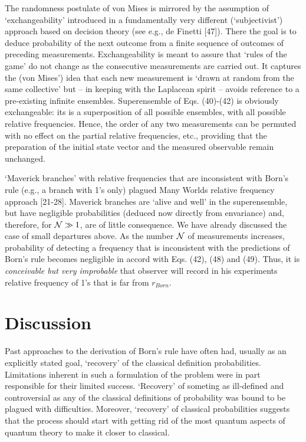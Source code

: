 \documentclass[aps,twocolumn,pra,epsfig]{revtex4}
\begin{document}
The randomness postulate of von Mises is mirrored by the assumption of
`exchangeability' introduced in a fundamentally very different (`subjectivist')
approach based on decision theory (see e.g., de Finetti [47]). There the goal
is to deduce probability of the next outcome from a finite sequence of
outcomes of preceding measurements. Exchangeability is meant to assure that
`rules of the game' do not change as the consecutive measurements are carried
out. It captures the (von Mises') idea that each new measurement is `drawn
at random from the same collective' but -- in keeping with the Laplacean
spirit -- avoids reference to a pre-existing infinite ensembles.
Superensemble of Eqs. (40)-(42) is obviously exchangeable:  its is 
a superposition of all possible ensembles, with all possible relative
frequencies. Hence, the order of any two measurements can be permuted 
with no effect on the partial relative frequencies, etc., providing that 
the preparation of the initial state vector and the measured observable 
remain unchanged. 

`Maverick branches' with relative frequencies that are inconsistent with Born's
rule (e.g., a branch with 1's only) plagued Many Worlds relative frequency
approach [21-28]. Maverick branches are `alive and well' in the superensemble,
but have negligible probabilities (deduced now directly from envariance) and,
therefore, for ${\cal N} \gg 1$, are of little consequence.  We have
already discussed the case of small departures above. As the number
${\cal N}$ of measurements increases, probability of detecting a frequency
that is inconsistent with the predictions of Born's rule becomes negligible
in accord with Eqs. (42), (48) and (49). Thus, it is {\it conceivable but very improbable} 
that observer will record in his experiments relative frequency of 1's that is 
far from $r_{Born}$.

\section{Discussion}

Past approaches to the derivation of Born's rule have often had, 
usually as an explicitly stated  goal,  `recovery'  of the classical 
definition probabilities. Limitations inherent in such
a formulation of the problem were in part responsible for their
limited success. `Recovery' of someting as ill-defined and controversial
as any of the classical definitions of probability was bound to be
plagued with difficulties. Moreover, `recovery' of classical probabilities 
suggests that the process should start with getting rid of the most 
quantum aspects of quantum theory to make it closer to classical. 
\end{document}
